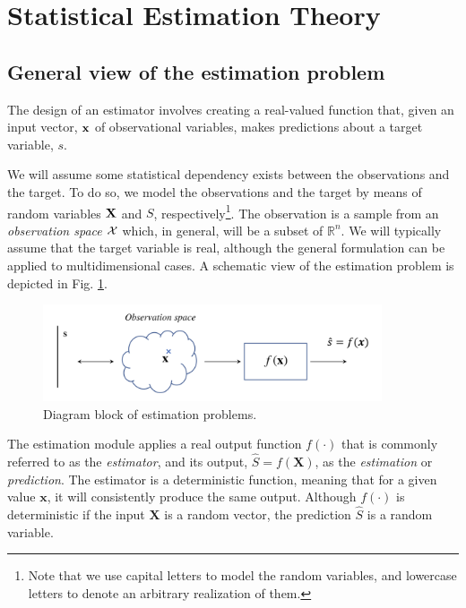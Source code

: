 \section{Statistical Estimation Theory}
\label{sec:SDT}



\subsection{General view of the estimation problem}
\label{subsec:hypotheses_problems}

The design of an estimator involves creating a real-valued function that, given an input vector, ${\bf x}$ of observational variables, makes predictions about a target variable, $s$.

We will assume some statistical dependency exists between the observations and the target. To do so, we model the observations and the target by means of random variables ${\bf X}$ and $S$, respectively\footnote{Note that we use capital letters to model the random variables, and lowercase letters to denote an arbitrary realization of them.}. The observation is a sample from an \textit{observation space} ${\cal X}$ which, in general, will be a subset of $\mathbb{R}^n$. We will typically assume that the target variable is real, although the general formulation can be applied to multidimensional cases. A schematic view of the estimation problem is depicted in Fig. \ref{fig:est_overview}.
\begin{figure}
\begin{center}
\includegraphics[width=10cm]{Figures//estimation_overview.png}
\end{center}
\caption{Diagram block of estimation problems.\label{fig:est_overview}}
\end{figure}

The estimation module applies a real output function $f(\cdot)$ that is commonly referred to as the \textit{estimator}, and its output, $\hat{S} = f(\mathbf{X})$, as the \textit{estimation} or \textit{prediction}. The estimator is a deterministic function, meaning that for a given value $\mathbf{x}$, it will consistently produce the same output. Although $f(\cdot)$ is deterministic if the input $\mathbf{X}$ is a random vector, the prediction $\hat{S}$ is a random variable.

